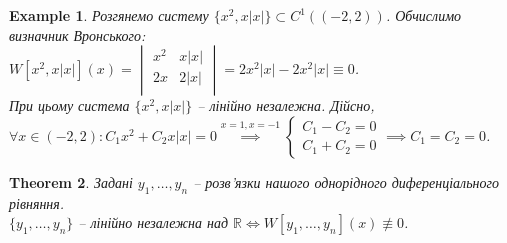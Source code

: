 \documentclass[a4paper, 10pt]{article}
\theoremstyle{theoremdd}
\newtheorem{theorem}{Theorem}[subsection]
\theoremstyle{theoremdd}
\theoremstyle{theoremdd}
\theoremstyle{theoremdd}
\newtheorem{example}[theorem]{Example}
\theoremstyle{theoremdd}
\theoremstyle{theoremdd}
\theoremstyle{theoremdd}
\theoremstyle{theoremdd}
\begin{document}
\begin{example}
 Розгянемо систему $\{x^2, x|x|\} \subset C^1((-2,2))$. Обчислимо визначник Вронського:\\
$\displaystyle W[x^2, x|x|](x) = 
\begin{vmatrix} 
	x^2 &  x|x| \\
	2x &  2|x| \\ 
\end{vmatrix} = 2x^2|x| - 2x^2|x| \equiv 0$.\\
При цьому система $\{x^2, x|x|\}$ -- лінійно незалежна. Дійсно,\\
$\displaystyle \forall x \in (-2,2): C_1x^2 + C_2 x|x| = 0  \overset{x = 1, x = -1}{\implies}
\begin{cases}
C_1 - C_2 = 0\\
C_1 + C_2 = 0
\end{cases} \implies C_1 = C_2 = 0
$.
\end{example}

\begin{theorem}
Задані $y_1, \dots, y_n$ -- розв'язки нашого однорідного диференціального рівняння.\\
$\{y_1, \dots, y_n\}$ -- лінійно незалежна над $\mathbb{R} \iff W[y_1, \dots, y_n](x) \not\equiv 0$.
\end{theorem}
\end{document}

